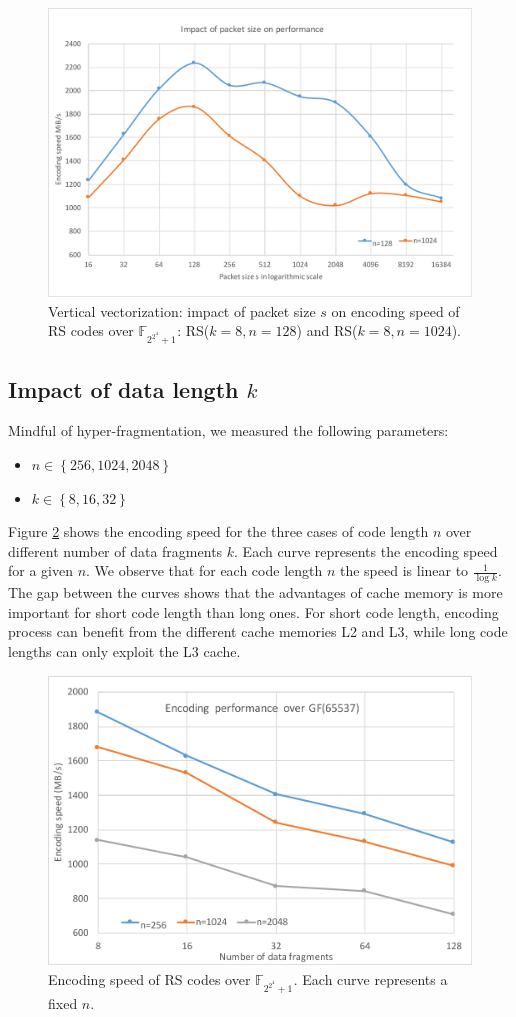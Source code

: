\documentclass[oneside,9pt]{article}
\newcommand{\gf}[2][]{ \mathbb{F}_{{#2}^{#1}} }
\begin{document}
\begin{figure}[!ht]
\centering
\includegraphics[width=0.7\columnwidth]{fnt_vertical_vec_pkt_size.pdf}
\caption{Vertical vectorization: impact of packet size $s$ on encoding speed of RS codes over $\gf{2^{2^4}+1}$: RS($k=8, n=128$) and RS($k=8, n=1024$).}
\label{fig:fnt_vertical_vec_pkt_size}
\end{figure}


\subsection{Impact of data length $k$}
Mindful of hyper-fragmentation, we measured the following parameters:

\begin{itemize}
\item $n \in \left\{ 256, 1024, 2048 \right\}$
\item $k \in \left\{ 8, 16, 32 \right\}$
\end{itemize}

Figure \ref{fig:fnt_k_n} shows the encoding speed for the three cases of code length $n$ over different number of data fragments $k$. Each curve represents the encoding speed for a given $n$. We observe that for each code length $n$ the speed is linear to $\frac{1}{\log{k}}$. The gap between the curves shows that the advantages of cache memory is more important for short code length than long ones. For short code length, encoding process can benefit from the different cache memories L2 and L3, while long code lengths can only exploit the L3 cache.
% 
% 
\begin{figure}[!ht]
\centering
\includegraphics[width=0.7\columnwidth]{fnt_k_n.pdf}
\caption{Encoding speed of RS codes over $\gf{2^{2^4}+1}$. Each curve represents a fixed $n$.}
\label{fig:fnt_k_n}
\end{figure}
\end{document}
